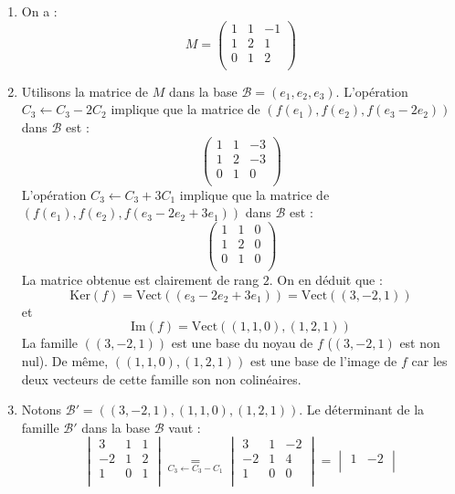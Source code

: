 \documentclass[a4paper,10pt]{report}
\begin{document}
\corr 

\begin{enumerate}
\item On a :
$$ M  = \begin{pmatrix}
1  & 1 & - 1 \\
1  & 2 & 1  \\
0  & 1 & 2 \\
\end{pmatrix}$$
\item Utilisons la matrice de $M$ dans la base $\mathcal{B}=(e_1,e_2,e_3)$. L'opération $C_3 \leftarrow C_3-2C_2$ implique que la matrice de $(f(e_1),f(e_2),f(e_3-2e_2))$ dans $\mathcal{B}$ est :
$$ \begin{pmatrix}
1  & 1 & - 3 \\
1  & 2 & -3  \\
0  & 1 & 0 \\
\end{pmatrix}$$
L'opération $C_3 \leftarrow C_3+3C_1$ implique que la matrice de $(f(e_1),f(e_2),f(e_3-2e_2+3e_1))$ dans $\mathcal{B}$ est :
$$ \begin{pmatrix}
1  & 1 & 0 \\
1  & 2 & 0  \\
0  & 1 & 0 \\
\end{pmatrix}$$
La matrice obtenue est clairement de rang $2$. On en déduit que :
$$ \textrm{Ker}(f) = \textrm{Vect}((e_3-2e_2+3e_1)) = \textrm{Vect}((3,-2,1))$$
et 
$$ \textrm{Im}(f) = \textrm{Vect}((1,1,0),(1,2,1))$$
La famille $((3,-2,1))$ est une base du noyau de $f$ ($(3,-2,1)$ est non nul). De même, $((1,1,0),(1,2,1))$ est une base de l'image de $f$ car les deux vecteurs de cette famille son non colinéaires.
\item Notons $\mathcal{B}'=((3,-2,1),(1,1,0),(1,2,1))$. Le déterminant de la famille $\mathcal{B}'$ dans la base $\mathcal{B}$ vaut :
$$ \begin{vmatrix}
3 & 1 & 1 \\
-2 & 1 & 2\\
1& 0 & 1\\
\end{vmatrix}  \underset{C_3 \leftarrow C_3 - C_1}{=} \begin{vmatrix}
3 & 1 & -2 \\
-2 & 1 & 4\\
1& 0 & 0\\
\end{vmatrix} = \begin{vmatrix}
 1 & -2 \\

\end{vmatrix}$$
\end{enumerate}
\end{document}
